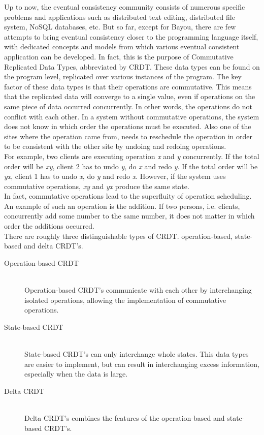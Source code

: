 \documentclass[a4paper,12pt]{report}
\begin{document}
Up to now, the eventual consistency community consists of numerous specific problems and applications such as distributed text editing, distributed file system, NoSQL databases, etc. But so far, except for Bayou, there are few attempts to bring eventual consistency closer to the programming language itself, with dedicated concepts and models from which various eventual consistent application can be developed. In fact, this is the purpose of Commutative Replicated Data Types, abbreviated by CRDT. These data types can be found on the program level, replicated over various instances of the program. The key factor of these data types is that their operations are commutative. This means that the replicated data will converge to a single value, even if operations on the same piece of data occurred concurrently. In other words, the operations do not conflict with each other. In a system without commutative operations, the system does not know in which order the operations must be executed. Also one of the sites where the operation came from, needs to reschedule the operation in order to be consistent with the other site by undoing and redoing operations. \\
\indent For example, two clients are executing operation \textit{x} and \textit{y} concurrently. If the total order will be \textit{xy}, client 2 has to undo \textit{y}, do \textit{x} and redo \textit{y}. If the total order will be \textit{yx}, client 1 has to undo \textit{x}, do \textit{y} and redo \textit{x}. However, if the system uses commutative operations, \textit{xy} and \textit{yx} produce the same state. \\
In fact, commutative operations lead to the superfluity of operation scheduling. An example of such an operation is the addition. If two persons, i.e. clients, concurrently add some number to the same number, it does not matter in which order the additions occurred. \\
There are roughly three distinguishable types of CRDT. operation-based, state-based and delta CRDT's. 

\begin{description}
    \item[Operation-based CRDT] \hfill \\Operation-based CRDT's communicate with each other by interchanging isolated operations, allowing the implementation of commutative operations.
    \item[State-based CRDT] \hfill \\State-based CRDT's can only interchange whole states. This data types are easier to implement, but can result in interchanging excess information, especially when the data is large.\\
    \item[Delta CRDT] \hfill \\Delta CRDT's combines the features of the operation-based and state-based CRDT's. 
\end{description}
\end{document}
